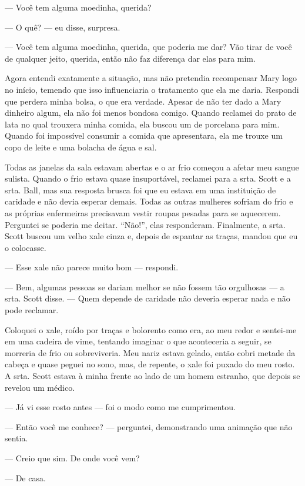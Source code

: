 --- Você tem alguma moedinha, querida?

--- O quê? --- eu disse, surpresa.

--- Você tem alguma moedinha, querida, que poderia me dar? Vão tirar de
você de qualquer jeito, querida, então não faz diferença dar elas para
mim.

Agora entendi exatamente a situação, mas não pretendia recompensar Mary
logo no início, temendo que isso influenciaria o tratamento que ela me
daria. Respondi que perdera minha bolsa, o que era verdade. Apesar de
não ter dado a Mary dinheiro algum, ela não foi menos bondosa comigo.
Quando reclamei do prato de lata no qual trouxera minha comida, ela
buscou um de porcelana para mim. Quando foi impossível consumir a comida
que apresentara, ela me trouxe um copo de leite e uma bolacha de água e
sal.

Todas as janelas da sala estavam abertas e o ar frio começou a afetar
meu sangue sulista. Quando o frio estava quase insuportável, reclamei
para a srta. Scott e a srta. Ball, mas sua resposta brusca foi que eu
estava em uma instituição de caridade e não devia esperar demais. Todas
as outras mulheres sofriam do frio e as próprias enfermeiras precisavam
vestir roupas pesadas para se aquecerem. Perguntei se poderia me deitar.
``Não!'', elas responderam. Finalmente, a srta. Scott buscou um
velho xale cinza e, depois de espantar as traças, mandou que eu o
colocasse.

--- Esse xale não parece muito bom --- respondi.

--- Bem, algumas pessoas se dariam melhor se não fossem tão orgulhosas
--- a srta. Scott disse. --- Quem depende de caridade não deveria
esperar nada e não pode reclamar.

Coloquei o xale, roído por traças e bolorento como era, ao meu redor e
sentei-me em uma cadeira de vime, tentando imaginar o que aconteceria a
seguir, se morreria de frio ou sobreviveria. Meu nariz estava gelado,
então cobri metade da cabeça e quase peguei no sono, mas, de repente, o
xale foi puxado do meu rosto. A srta. Scott estava à minha frente ao
lado de um homem estranho, que depois se revelou um médico.

--- Já vi esse rosto antes --- foi o modo como me cumprimentou.

--- Então você me conhece? --- perguntei, demonstrando uma animação que
não sentia.

--- Creio que sim. De onde você vem?

--- De casa.

